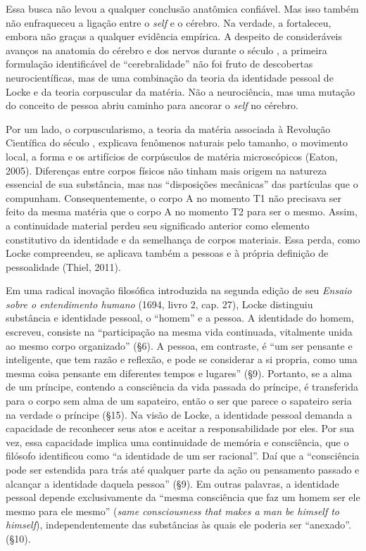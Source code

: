 Essa busca não levou a qualquer conclusão anatômica confiável. Mas isso
também não enfraqueceu a ligação entre o \emph{self} e o cérebro. Na verdade, a
fortaleceu, embora não graças a qualquer evidência empírica. A despeito
de consideráveis avanços na anatomia do cérebro e dos nervos durante o
século , a primeira formulação identificável de ``cerebralidade''
não foi fruto de descobertas neurocientíficas, mas de uma combinação da
teoria da identidade pessoal de Locke e da teoria corpuscular da
matéria. Não a neurociência, mas uma mutação do conceito de pessoa abriu
caminho para ancorar o \emph{self} no cérebro.

Por um lado, o corpuscularismo, a teoria da matéria associada à
Revolução Científica do século , explicava fenômenos naturais pelo
tamanho, o movimento local, a forma e os artifícios de corpúsculos de
matéria microscópicos (Eaton, 2005). Diferenças entre corpos físicos não
tinham mais origem na natureza essencial de sua substância, mas nas
``disposições mecânicas'' das partículas que o compunham.
Consequentemente, o corpo A no momento T1 não precisava ser feito da
mesma matéria que o corpo A no momento T2 para ser o mesmo. Assim, a
continuidade material perdeu seu significado anterior como elemento
constitutivo da identidade e da semelhança de corpos materiais. Essa
perda, como Locke compreendeu, se aplicava também a pessoas e à própria
definição de pessoalidade (Thiel, 2011).

Em uma radical inovação filosófica introduzida na segunda edição de seu
\emph{Ensaio sobre o entendimento humano} (1694, livro 2, cap. 27),
Locke distinguiu substância e identidade pessoal, o ``homem'' e a
pessoa. A identidade do homem, escreveu, consiste na ``participação na
mesma vida continuada, vitalmente unida ao mesmo corpo organizado'' (§6). A pessoa, em
contraste, é ``um ser pensante e inteligente, que tem razão e reflexão,
e pode se considerar a si propria, como uma mesma coisa pensante em
diferentes tempos e lugares'' (§9). Portanto, se a alma de um príncipe,
contendo a consciência da vida passada do príncipe, é transferida para o
corpo sem alma de um sapateiro, então o ser que parece o sapateiro seria
na verdade o príncipe (§15). Na visão de Locke, a identidade pessoal
demanda a capacidade de reconhecer seus atos e aceitar a
responsabilidade por eles. Por sua vez, essa capacidade implica uma
continuidade de memória e consciência, que o filósofo identificou como
``a identidade de um ser racional''. Daí que a ``consciência pode ser
estendida para trás até qualquer parte da ação ou pensamento passado e
alcançar a identidade daquela pessoa'' (§9). Em outras palavras, a
identidade pessoal depende exclusivamente da ``mesma consciência que faz
um homem ser ele mesmo para ele mesmo'' (\emph{same consciousness that
makes a man be himself to himself}), independentemente das substâncias às
quais ele poderia ser ``anexado''. (§10).

